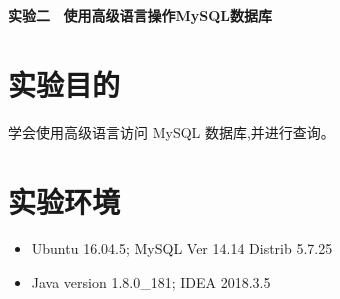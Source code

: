 \documentclass{ML}
\begin{document}
\maketitle

\tableofcontents
\newpage

\begin{center}
    \textbf{ 实验二 \ 使用高级语言操作MySQL数据库}
\end{center}
\section{实验目的}
学会使用高级语言访问 MySQL 数据库,并进行查询。
\section{实验环境}
\begin{itemize}
    \item Ubuntu 16.04.5; MySQL Ver 14.14 Distrib 5.7.25
    \item Java version 1.8.0\_181; IDEA 2018.3.5
\end{itemize}
\end{document}
